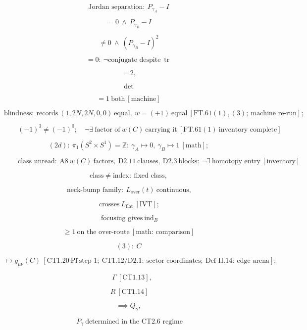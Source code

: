 \begin{theorem}
\[
\text{Jordan separation}:\ P_{\gamma_A}-I
\]

\[
= 0\ \wedge\ P_{\gamma_B}-I
\]

\[
\ne 0\ \wedge\ (P_{\gamma_B}-I)^2
\]

\[
= 0:\ \neg\text{conjugate despite}\ \operatorname{tr}
\]

\[
= 2,
\]

\[
\det
\]

\[
= 1\ \text{both}\ [\text{machine}]
\]

\[
\text{blindness}:\ \text{records}\ (1,2N,2N,0,0)\ \text{equal},\ w=(+1)\ \text{equal}\ [\mathrm{FT.61}(1),(3);\ \text{machine re-run}];
\]

\[
\qquad (-1)^3\ne(-1)^0;\quad\neg\exists\ \text{factor of}\ w(C)\ \text{carrying it}\ [\mathrm{FT.61}(1)\ \text{inventory complete}]
\]

\[
(2d):\ \pi_1(S^2\times S^1)=\mathbb Z:\ \gamma_A\mapsto0,\ \gamma_B\mapsto1\ [\text{math}];
\]

\[
\qquad \text{class unread}:\ \mathrm{A8}\ w(C)\ \text{factors},\ \mathrm{D2.11}\ \text{clauses},\ \mathrm{D2.3}\ \text{blocks}:\ \neg\exists\ \text{homotopy entry}\ [\text{inventory}]
\]

\[
\text{class}\ne\text{index}:\ \text{fixed class},
\]

\[
\ \text{neck-bump family}:\ L_{\text{over}}(t)\ \text{continuous},
\]

\[
\ \text{crosses}\ L_{\text{flat}}\ [\mathrm{IVT}];
\]

\[
\ \text{focusing gives}\ \operatorname{ind}_B
\]

\[
\ge 1\ \text{on the over-route}\ [\text{math: comparison}]
\]

\[
(3):\ C
\]

\[
\mapsto g_{\mu\nu}(C)\ [\mathrm{CT1.20}\ \mathrm{Pf}\ \text{step 1};\ \mathrm{CT1.12}/\mathrm{D2.1}:\ \text{sector coordinates};\ \mathrm{Def\text{-}H.14}:\ \text{edge arena}];
\]

\[
\quad\Gamma\ [\mathrm{CT1.13}],
\]

\[
\ R\ [\mathrm{CT1.14}]
\]

\[
\implies Q_\gamma,
\]

\[
\ P_\gamma\ \text{determined in the CT2.6 regime}
\]


\end{theorem}

